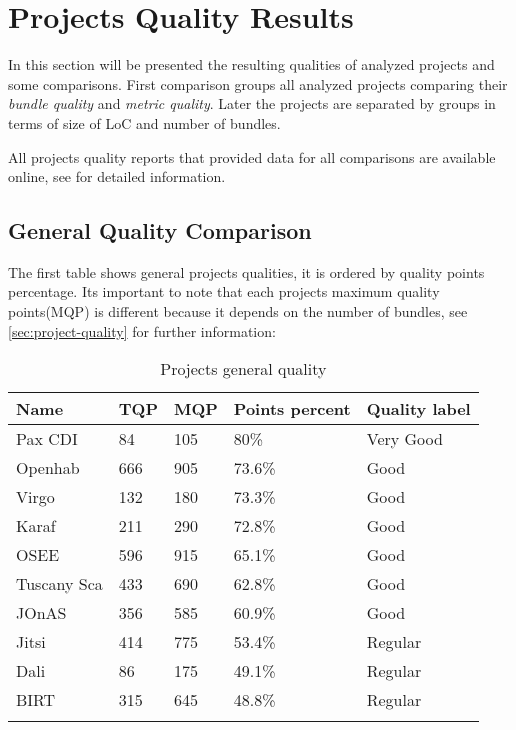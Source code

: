 \section{Projects Quality Results}
In this section will be presented the resulting qualities of analyzed projects and some comparisons. First comparison groups all analyzed  projects comparing their \emph{bundle quality} and \emph{metric quality}. Later the projects are separated by groups in terms of size of LoC and number of bundles.

All projects quality reports that provided data for all comparisons are available online, see \citep{intrabundle reports 2014} for detailed information. 

\subsection{General Quality Comparison}

The first table shows general projects qualities, it is ordered by quality points percentage. Its important to note that each projects maximum quality points(MQP) is different because it depends on the number of bundles, see \ref{sec:project-quality} for further information:

\begin{table}[h]
\caption{Projects general quality}
\label{projects-general-quality}
    \begin{tabular}{  p{3cm} | p{2cm} | p{2cm} | p{3cm} | p{4cm}}
    \Xhline{2\arrayrulewidth}
    Name & TQP & MQP & Points percent & Quality label \\  \hline
    Pax CDI & 84 & 105 & 80\% & Very Good\\ \hline 
    Openhab & 	666 & 905 & 73.6\% & Good\\ \hline
    Virgo & 132 & 180 & 73.3\% & Good\\ \hline
    Karaf & 211 & 290 & 72.8\% & Good\\ \hline
    OSEE & 596 & 915 & 65.1\% & Good\\ \hline
    Tuscany Sca & 433 & 690 & 62.8\% & Good\\ \hline
    JOnAS & 356 & 585 & 60.9\%  & Good\\ \hline
    Jitsi & 414 & 775 & 53.4\% & Regular\\ \hline
    Dali & 86 & 175 & 49.1\%  & Regular\\ \hline
    BIRT & 315 & 645 & 48.8\% & Regular\\ 
   \Xhline{2\arrayrulewidth}
    \end{tabular}
\end{table}
\FloatBarrier 

